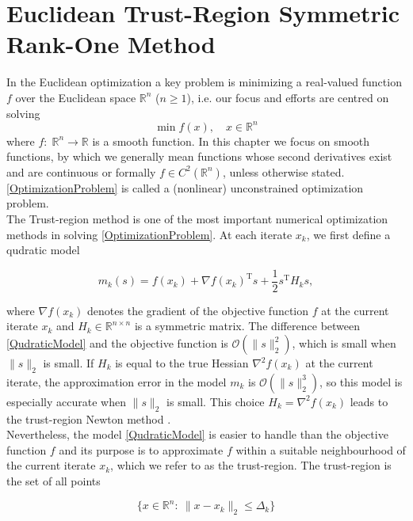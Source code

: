 \chapter{Euclidean Trust-Region Symmetric Rank-One Method}

In the Euclidean optimization a key problem is minimizing a real-valued function $f$ over the Euclidean space $\mathbb{R}^n$ ($n \geq 1$), i.e. our focus and efforts are centred on solving 
\begin{equation}\label{OptimizationProblem}
    \min f(x), \quad x \in \mathbb{R}^n
\end{equation}  
where $f \colon \; \mathbb{R}^n \to \mathbb{R}$ is a smooth function. In this chapter we focus on smooth functions, by which we generally mean functions whose second derivatives exist and are continuous or formally $f \in C^2(\mathbb{R}^n)$, unless otherwise stated. \cref{OptimizationProblem} is called a (nonlinear) unconstrained optimization problem. \\
The Trust-region method is one of the most important numerical optimization methods in solving \cref{OptimizationProblem}. At each iterate $x_k$, we first define a qudratic model 

\begin{equation}\label{QudraticModel}
    m_k(s) = f(x_k) + \nabla f(x_k)^{\mathrm{T}} s + \frac{1}{2} s^{\mathrm{T}} H_k s,
\end{equation}

where $\nabla f(x_k)$ denotes the gradient of the objective function $f$ at the current iterate $x_k$ and $H_k \in  \mathbb{R}^{n \times n}$ is a symmetric matrix. The difference between \cref{QudraticModel} and the objective function is $\mathcal{O}(\lVert s \rVert^{2}_2)$, which is small when $\lVert s \rVert_2$ is small. If $H_k$ is equal to the true Hessian $\nabla^2 f(x_k)$ at the current iterate, the approximation error in the model $m_k$ is $\mathcal{O}(\lVert s \rVert^{3}_2)$, so this model is especially accurate when $\lVert s \rVert_2$ is small. This choice $H_k = \nabla^2 f(x_k)$ leads to the trust-region Newton method \cite[p.~68]{NocedalWright:2006}. \\
Nevertheless, the model \cref{QudraticModel} is easier to handle than the objective function $f$ and its purpose is to approximate $f$ within a suitable neighbourhood of the current iterate $x_k$, which we refer to as the trust-region. The trust-region is the set of all points

\begin{equation}\label{TrustRegion}
    \{ x \in \mathbb{R}^n \colon \ \lVert x - x_k \rVert_2 \leq \Delta_k \}
\end{equation}

